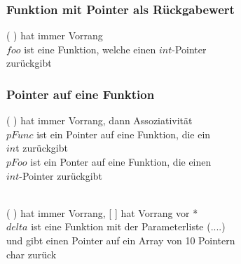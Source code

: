 	 	\subsubsection{Funktion mit Pointer als Rückgabewert}
	 		\begin{minipage}[t]{10 cm}
	 			\vspace*{-0.5cm}
	 			
	 		\end{minipage}
	 		\hspace*{0.5cm}
	 		\begin{minipage}[t]{10 cm}
	 			( ) hat immer Vorrang\\
	 			$foo$ ist eine Funktion, welche einen $int$-Pointer\\ zurückgibt
	 		\end{minipage}
	 	\subsubsection{Pointer auf eine Funktion}
	 		\begin{minipage}[t]{10 cm}
	 			\vspace*{-0.5cm}
	 			
	 		\end{minipage}
	 		\hspace*{0.5cm}
	 		\begin{minipage}[t]{10 cm}
	 			( ) hat immer Vorrang, dann Assoziativität\\
	 			$pFunc$ ist ein Pointer auf eine Funktion, die ein\\ $in$t zurückgibt\\
	 			$pFoo$ ist ein Ponter auf eine Funktion, die einen\\ $int$-Pointer zurückgibt\\\\
	 		\end{minipage}
	 		\begin{minipage}[t]{10 cm}
	 			\vspace*{-0.5cm}
	 			
	 		\end{minipage}
	 		\hspace*{0.5cm}
	 		\begin{minipage}[t]{10 cm}
	 			( ) hat immer Vorrang, [ ] hat Vorrang vor *\\
	 			$delta$ ist eine Funktion mit der Parameterliste (....)\\ und gibt einen Pointer auf ein Array von 10 Pointern\\ char zurück
	 		\end{minipage}
